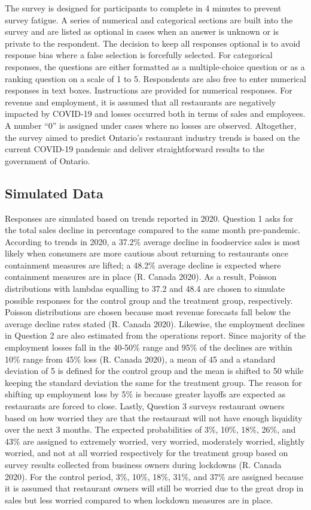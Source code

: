 \documentclass[
]{article}
\begin{document}
The survey is designed for participants to complete in 4 minutes to prevent survey fatigue. A series of numerical and categorical sections are built into the survey and are listed as optional in cases when an answer is unknown or is private to the respondent. The decision to keep all responses optional is to avoid response bias where a false selection is forcefully selected. For categorical responses, the questions are either formatted as a multiple-choice question or as a ranking question on a scale of 1 to 5. Respondents are also free to enter numerical responses in text boxes. Instructions are provided for numerical responses. For revenue and employment, it is assumed that all restaurants are negatively impacted by COVID-19 and losses occurred both in terms of sales and employees. A number ``0'' is assigned under cases where no losses are observed. Altogether, the survey aimed to predict Ontario's restaurant industry trends is based on the current COVID-19 pandemic and deliver straightforward results to the government of Ontario.

\hypertarget{simulated-data}{%
\subsection{Simulated Data}\label{simulated-data}}

Responses are simulated based on trends reported in 2020. Question 1 asks for the total sales decline in percentage compared to the same month pre-pandemic. According to trends in 2020, a 37.2\% average decline in foodservice sales is most likely when consumers are more cautious about returning to restaurants once containment measures are lifted; a 48.2\% average decline is expected where containment measures are in place (R. Canada 2020). As a result, Poisson distributions with lambdas equalling to 37.2 and 48.4 are chosen to simulate possible responses for the control group and the treatment group, respectively. Poisson distributions are chosen because most revenue forecasts fall below the average decline rates stated (R. Canada 2020). Likewise, the employment declines in Question 2 are also estimated from the operations report. Since majority of the employment losses fall in the 40-50\% range and 95\% of the declines are within 10\% range from 45\% loss (R. Canada 2020), a mean of 45 and a standard deviation of 5 is defined for the control group and the mean is shifted to 50 while keeping the standard deviation the same for the treatment group. The reason for shifting up employment loss by 5\% is because greater layoffs are expected as restaurants are forced to close. Lastly, Question 3 surveys restaurant owners based on how worried they are that the restaurant will not have enough liquidity over the next 3 months. The expected probabilities of 3\%, 10\%, 18\%, 26\%, and 43\% are assigned to extremely worried, very worried, moderately worried, slightly worried, and not at all worried respectively for the treatment group based on survey results collected from business owners during lockdowns (R. Canada 2020). For the control period, 3\%, 10\%, 18\%, 31\%, and 37\% are assigned because it is assumed that restaurant owners will still be worried due to the great drop in sales but less worried compared to when lockdown measures are in place.
\end{document}
